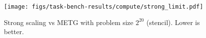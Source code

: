 \begin{figure}[t]
\centering
\texttt{[image: figs/task-bench-results/compute/strong\_limit.pdf]}
\vspace{-0.6cm}
\caption{\color{blue} Strong scaling vs METG with problem size $2^{20}$ (stencil). Lower is better.\label{fig:strong-scaling}}
\vspace{-0.25cm}
\end{figure}
